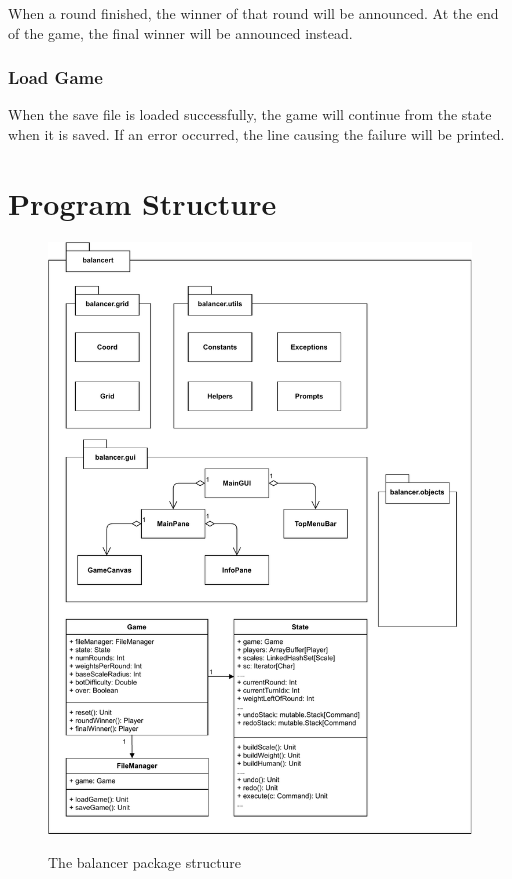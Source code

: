 \documentclass[12pt]{article}
\begin{document}
When a round finished, the winner of that round will be announced. At the end of
the game, the final winner will be announced instead.

\subsubsection{Load Game}

When the save file is loaded successfully, the game will continue from the state
when it is saved. If an error occurred, the line causing the
failure will be printed.

\section{Program Structure}

\begin{figure}
  \centering
  \caption{The balancer package structure}
  \includegraphics[width=\textwidth]{UML1.pdf}
  \label{fig:uml1}
\end{figure}
\end{document}
